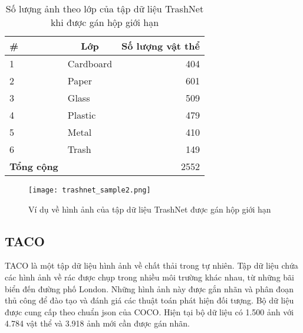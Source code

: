 \documentclass[../the.tex]{subfiles}
\begin{document}
\begin{table}[!ht]
	\centering
	\caption{Số lượng ảnh theo lớp của tập dữ liệu TrashNet khi được gán hộp giới hạn}
	\begin{tabular}{|l|l|r|}
		\hline
		\multicolumn{1}{|l|}{
			\textbf{\#}}
		 & \multicolumn{1}{c|}{\textbf{Lớp}}
		 & \multicolumn{1}{c|}{\textbf{Số lượng vật thể}} \\
		\hline

		1
		 & Cardboard
		 & 404                                            \\
		\hline

		2
		 & Paper
		 & 601                                            \\
		\hline

		3
		 & Glass
		 & 509                                            \\
		\hline

		4
		 & Plastic
		 & 479                                            \\
		\hline

		5
		 & Metal
		 & 410                                            \\
		\hline

		6
		 & Trash
		 & 149                                            \\
		\hline


		\textbf{Tổng cộng}
		 &
		 & 2552                                           \\
		\hline
	\end{tabular}

	\label{tab:dataset1}
\end{table}

\begin{figure}[H]
	\centering
	\texttt{[image: trashnet\_sample2.png]}
	\caption{Ví dụ về hình ảnh của tập dữ liệu TrashNet được gán hộp giới hạn}
	\label{fig:dataset_1}
\end{figure}

\subsection{TACO}
\label{sec:TACO}
{\fontsize{13}{12} \selectfont

	TACO là một tập dữ liệu hình ảnh về chất thải trong tự nhiên. Tập dữ liệu chứa các hình ảnh về rác được chụp trong nhiều môi trường khác nhau, từ những bãi biển đến đường phố London. Những hình ảnh này được gắn nhãn và phân đoạn thủ công để đào tạo và đánh giá các thuật toán phát hiện đối tượng.
	Bộ dữ liệu được cung cấp
	theo chuẩn json của COCO. Hiện tại bộ dữ liệu có 1.500 ảnh với 4.784 vật thể
	và 3.918 ảnh mới cần được gán nhãn.

}
\end{document}

